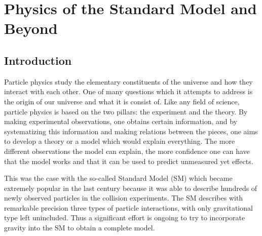 \chapter{Physics of the Standard Model and Beyond}
\label{chap:Theory}



\section{Introduction}
Particle physics study the elementary constituents of the universe and how they interact with each other. One of many questions which it attempts to address is the origin of our universe and what it is consist of. 
Like any field of science, particle physics is based on the two pillars: the experiment and the theory.
By making experimental observations, one obtains certain information, and by systematizing this information and making relations between the pieces, one aims to develop a theory or a model which would explain everything.
The more different observations the model can explain, the more confidence one can have that the model works and that it can be used to predict unmeasured yet effects. 

This was the case with the so-called Standard Model (SM) which became extremely popular in the last century because it was able to describe hundreds of newly observed particles in the collision experiments.
The SM describes with remarkable precision three types of particle interactions, with only gravitational type left unincluded.
Thus a significant effort is ongoing to try to incorporate gravity into the SM to obtain a complete model.

